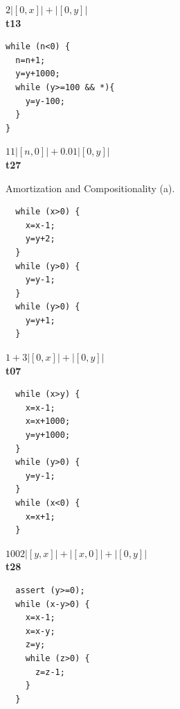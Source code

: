 \documentclass{sigplanconf}
\begin{document}
{\begin{figure}
\begin{minipage}[b]{\progwidth}
\begin{center}
$2|[0,x]| + |[0,y]|$
\\[.7\baselineskip]
      {\bf t13}
    \end{center}
  \end{minipage}
%
%
%
  \begin{minipage}[b]{\progwidth}
    \begin{center}
   \begin{lstlisting}
while (n<0) {
  n=n+1;
  y=y+1000;
  while (y>=100 && *){
    y=y-100;
  }
}
   \end{lstlisting}

$11|[n,0]| + 0.01|[0,y]|$
\\[.7\baselineskip]
      {\bf t27}
    \end{center}
  \end{minipage}
   \caption{Amortization and Compositionality (a).}
  \label{fig:cat1a}
\end{figure}


\begin{figure}
 \setlength{\progwidth}{.18\linewidth}
  \centering

  \begin{minipage}[b]{\progwidth}
    \begin{center}
   \begin{lstlisting}
  while (x>0) {
    x=x-1;
    y=y+2;
  }
  while (y>0) {
    y=y-1;
  }
  while (y>0) {
    y=y+1;
  }
   \end{lstlisting}

$1 + 3|[0,x]| + |[0,y]|$
\\[.7\baselineskip]
      {\bf t07}
    \end{center}
  \end{minipage}%
%
%
%
  \begin{minipage}[b]{\progwidth}
    \begin{center}
   \begin{lstlisting}
  while (x>y) {
    x=x-1;
    x=x+1000;
    y=y+1000;
  }
  while (y>0) {
    y=y-1;
  }
  while (x<0) {
    x=x+1;
  }
   \end{lstlisting}

$1002|[y,x]|+|[x,0]|+|[0,y]|$
\\[.7\baselineskip]
      {\bf t28}
    \end{center}
  \end{minipage}%
%
%
  \begin{minipage}[b]{\progwidth}
    \begin{center}
   \begin{lstlisting}
  assert (y>=0);
  while (x-y>0) {
    x=x-1;
    x=x-y;
    z=y;
    while (z>0) {
      z=z-1;
    }
  }
   \end{lstlisting}


\end{center}
\end{minipage}
\end{figure}}
\end{document}
